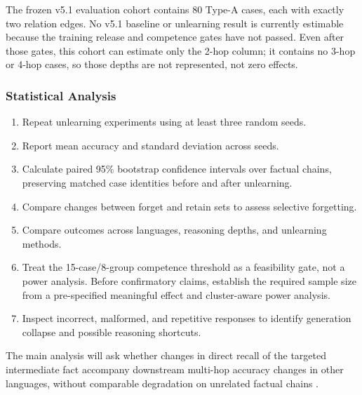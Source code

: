 \documentclass[10pt,a4paper]{article}
\begin{document}

The frozen v5.1 evaluation cohort contains 80 Type-A cases, each with exactly two relation edges. No v5.1 baseline or unlearning result is currently estimable because the training release and competence gates have not passed. Even after those gates, this cohort can estimate only the 2-hop column; it contains no 3-hop or 4-hop cases, so those depths are not represented, not zero effects.


\subsubsection*{Statistical Analysis}

\begin{enumerate}

    \item Repeat unlearning experiments using
    at least three random seeds.

    \item Report mean accuracy and standard deviation
    across seeds.

    \item Calculate paired 95\% bootstrap confidence
    intervals over factual chains, preserving
    matched case identities before and after
    unlearning.

    \item Compare changes between forget and retain
    sets to assess selective forgetting.

    \item Compare outcomes across languages,
    reasoning depths, and unlearning methods.

    \item Treat the 15-case/8-group competence threshold
    as a feasibility gate, not a power analysis. Before
    confirmatory claims, establish the required sample size
    from a pre-specified meaningful effect and cluster-aware
    power analysis.

    \item Inspect incorrect, malformed, and repetitive
    responses to identify generation collapse
    and possible reasoning shortcuts.

\end{enumerate}

The main analysis will ask whether changes in direct recall of the targeted intermediate fact accompany downstream multi-hop accuracy changes in other languages, without comparable degradation on unrelated factual chains \cite{thaker2025weak}.
\end{document}
